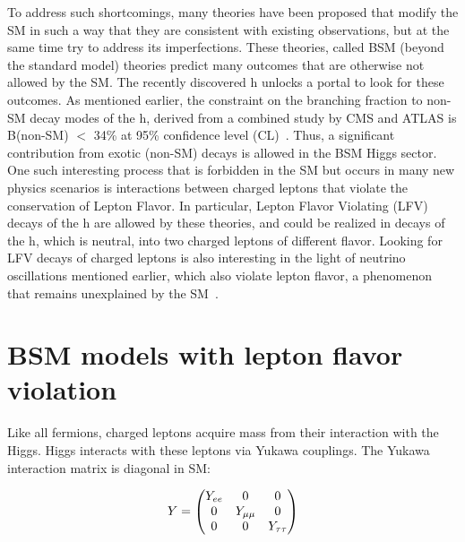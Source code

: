 To address such shortcomings, many theories have been proposed that modify the SM in such a way that they are consistent with existing observations, but at the same time try to address its imperfections. These theories, called BSM (beyond the standard model) theories predict many outcomes that are otherwise not allowed by the SM. The recently discovered h unlocks a portal to look for these outcomes. As mentioned earlier, the constraint on the branching fraction to non-SM decay modes of the h, derived from a combined study by CMS and ATLAS is B(non-SM) $<$ 34\% at 95\% confidence level (CL)~\cite{JHEP2016:45}. Thus, a significant contribution from exotic (non-SM) decays is allowed in the BSM Higgs sector. One such interesting process that is forbidden in the SM but occurs in many new physics scenarios is interactions between charged leptons that violate the conservation of Lepton Flavor. In particular, Lepton Flavor Violating (LFV) decays of the h are allowed by these theories, and could be realized in decays of the h, which is neutral, into two charged leptons of different flavor. Looking for LFV decays of charged leptons is also interesting in the light of neutrino oscillations mentioned earlier, which also violate lepton flavor, a phenomenon that remains unexplained by the SM~\cite{th_kell}.


\section{BSM models with lepton flavor violation}
\label{sec:BSM}
Like all fermions, charged leptons acquire mass from their interaction with the Higgs. Higgs interacts with these leptons via Yukawa couplings. The Yukawa interaction matrix is diagonal in SM:

\[
  Y=\begin{pmatrix}
    Y_{ee}       & 0 & 0  \\
    0       & Y_{\mu\mu} & 0  \\
    0       & 0 & Y_{\tau\tau}
  \end{pmatrix}
\]

